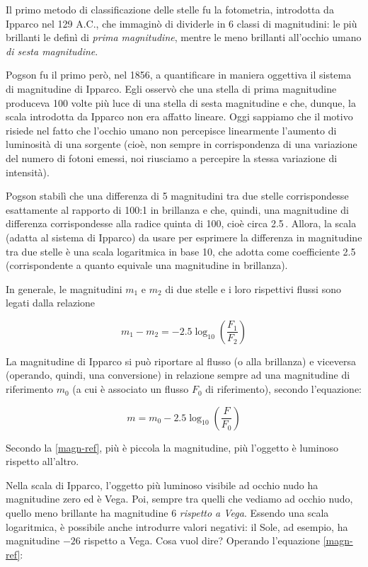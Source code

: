 Il primo metodo di classificazione delle stelle fu la fotometria, introdotta da Ipparco nel 129 A.C., che immaginò di dividerle in 6 classi di magnitudini: le più brillanti le definì di \textit{prima magnitudine}, mentre le meno brillanti all'occhio umano \textit{di sesta magnitudine}.

Pogson fu il primo però, nel 1856, a quantificare in maniera oggettiva il sistema di magnitudine di Ipparco. Egli osservò che una stella di prima magnitudine produceva 100 volte più luce di una stella di sesta magnitudine e che, dunque, la scala introdotta da Ipparco non era affatto lineare. Oggi sappiamo che il motivo risiede nel fatto che l'occhio umano non percepisce linearmente l'aumento di luminosità di una sorgente (cioè, non sempre in corrispondenza di una variazione del numero di fotoni emessi, noi riusciamo a percepire la stessa variazione di intensità).

Pogson stabilì che una differenza di 5 magnitudini tra due stelle corrispondesse esattamente al rapporto di 100:1 in brillanza e che, quindi, una magnitudine di differenza corrispondesse alla radice quinta di 100, cioè circa 2.5\,. Allora, la scala (adatta al sistema di Ipparco) da usare per esprimere la differenza in magnitudine tra due stelle è una scala logaritmica in base 10, che adotta come coefficiente 2.5 (corrispondente a quanto equivale una magnitudine in brillanza).

In generale, le magnitudini $m_1$ e $m_2$ di due stelle e i loro rispettivi flussi sono legati dalla relazione

\begin{equation}
    m_1 - m_2=-2.5 \log_{10} \left( \frac{F_1}{F_2} \right)
\end{equation}

La magnitudine di Ipparco si può riportare al flusso (o alla brillanza) e viceversa (operando, quindi, una conversione) in relazione sempre ad una magnitudine di riferimento $m_0$ (a cui è associato un flusso $F_0$ di riferimento), secondo l'equazione:

\begin{equation}
   m = m_0 - 2.5\log_{10} \left( \frac{F}{F_0} \right)
   \label{magn-ref}
\end{equation}

Secondo la \eqref{magn-ref}, più è piccola la magnitudine, più l'oggetto è luminoso rispetto all'altro.

Nella scala di Ipparco, l'oggetto più luminoso visibile ad occhio nudo ha magnitudine zero ed è Vega. Poi, sempre tra quelli che vediamo ad occhio nudo, quello meno brillante ha magnitudine 6 \textit{rispetto a Vega}. Essendo una scala logaritmica, è possibile anche introdurre valori negativi: il Sole, ad esempio, ha magnitudine $-26$ rispetto a Vega. Cosa vuol dire? Operando l'equazione \eqref{magn-ref}:

